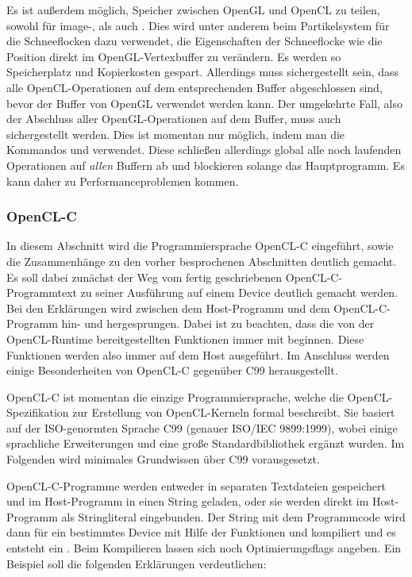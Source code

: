 Es ist außerdem möglich, Speicher zwischen OpenGL und OpenCL zu
teilen, sowohl für image-, als auch . Dies wird unter
anderem beim Partikelsystem für die Schneeflocken dazu verwendet, die
Eigenschaften der Schneeflocke wie die Position direkt im
OpenGL-Vertexbuffer zu verändern. Es werden so Speicherplatz und
Kopierkosten gespart. Allerdings muss sichergestellt sein, dass alle
OpenCL-Operationen auf dem entsprechenden Buffer abgeschlossen sind,
bevor der Buffer von OpenGL verwendet werden kann. Der umgekehrte
Fall, also der Abschluss aller OpenGL-Operationen auf dem Buffer, muss
auch sichergestellt werden. Dies ist momentan nur möglich, indem man
die Kommandos  und
 verwendet. Diese schließen allerdings
global alle noch laufenden Operationen auf \emph{allen} Buffern ab und
blockieren solange das Hauptprogramm. Es kann daher zu
Performanceproblemen kommen.

\subsubsection{OpenCL-C}

In diesem Abschnitt wird die Programmiersprache OpenCL-C eingeführt,
sowie die Zusammenhänge zu den vorher besprochenen Abschnitten
deutlich gemacht. Es soll dabei zunächst der Weg vom fertig
geschriebenen OpenCL-C-Programmtext zu seiner Ausführung auf einem
Device deutlich gemacht werden. Bei den Erklärungen wird
zwischen dem Host-Programm und dem OpenCL-C-Programm hin- und
hergesprungen. Dabei ist zu beachten, dass die von der OpenCL-Runtime
bereitgestellten Funktionen immer mit
 beginnen. Diese Funktionen
werden also immer auf dem Host ausgeführt. Im Anschluss werden
einige Besonderheiten von OpenCL-C gegenüber C99 herausgestellt.

OpenCL-C ist momentan die einzige Programmiersprache, welche die
OpenCL-Spe\-zi\-fi\-ka\-ti\-on zur Erstellung von OpenCL-Kerneln formal
beschreibt. Sie basiert auf der ISO-genormten Sprache C99 (genauer
ISO/IEC 9899:1999), wobei einige sprachliche Erweiterungen und eine
große Standardbibliothek ergänzt wurden. Im Folgenden wird minimales
Grundwissen über C99 vorausgesetzt.

OpenCL-C-Programme werden entweder in separaten Textdateien
gespeichert und im Host-Programm in einen String geladen, oder sie
werden direkt im Host-Programm als Stringliteral eingebunden. Der
String mit dem Programmcode wird dann für ein bestimmtes
Device
mit Hilfe der Funktionen 
und  kompiliert und es entsteht ein
. Beim Kompilieren lassen sich noch
Optimierungsflags angeben. Ein Beispiel soll die folgenden Erklärungen
verdeutlichen:

